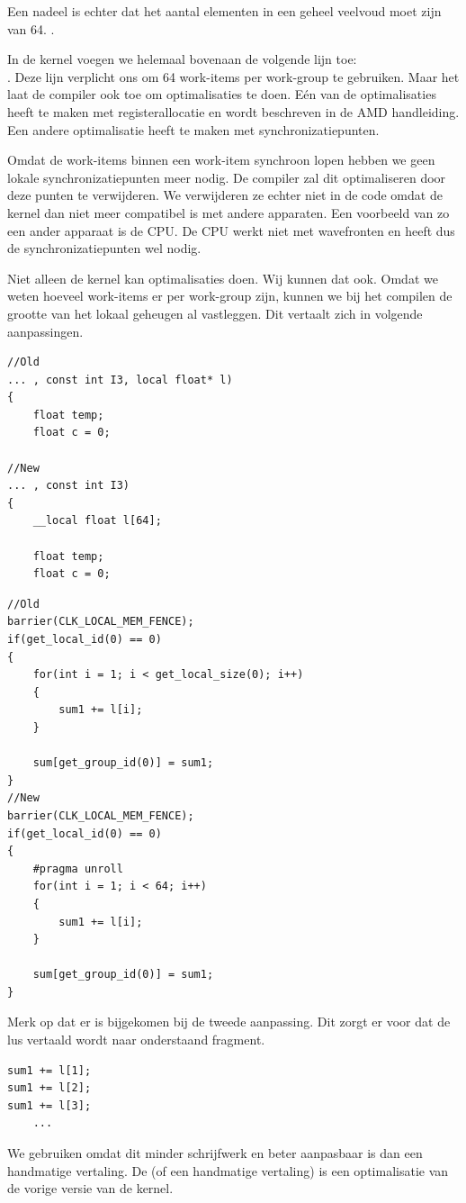 Een nadeel is echter dat het aantal elementen in \TT{} een geheel veelvoud moet zijn van 64. .

In de kernel voegen we helemaal bovenaan de volgende lijn toe:\\ . Deze lijn verplicht ons om 64 work-items per work-group te gebruiken. Maar het laat de compiler ook toe om optimalisaties te doen. E\'en van de optimalisaties heeft te maken met registerallocatie en wordt beschreven in de AMD handleiding\cite[p.~6-27]{ amd}. Een andere optimalisatie heeft te maken met synchronizatiepunten.

Omdat de work-items binnen een work-item synchroon lopen hebben we geen lokale synchronizatiepunten meer nodig. De compiler zal dit optimaliseren door deze punten te verwijderen. We verwijderen ze echter niet in de code omdat de kernel dan niet meer compatibel is met andere apparaten. Een voorbeeld van zo een ander apparaat is de CPU. De CPU werkt niet met wavefronten en heeft dus de synchronizatiepunten wel nodig.

Niet alleen de kernel kan optimalisaties doen. Wij kunnen dat ook. Omdat we weten hoeveel work-items er per work-group zijn, kunnen we bij het compilen de grootte van het lokaal geheugen al vastleggen. Dit vertaalt zich in volgende aanpassingen.

\begin{lstlisting}
//Old
... , const int I3, local float* l)
{
    float temp;
    float c = 0;

//New
... , const int I3)
{
    __local float l[64];
    
    float temp;
    float c = 0;
\end{lstlisting}
\begin{lstlisting}
//Old
barrier(CLK_LOCAL_MEM_FENCE);
if(get_local_id(0) == 0)
{        
    for(int i = 1; i < get_local_size(0); i++)
    {
        sum1 += l[i];
    }
    
    sum[get_group_id(0)] = sum1;
}
//New
barrier(CLK_LOCAL_MEM_FENCE);
if(get_local_id(0) == 0)
{        
    #pragma unroll
    for(int i = 1; i < 64; i++)
    {
        sum1 += l[i];
    }
    
    sum[get_group_id(0)] = sum1;
}
\end{lstlisting}

Merk op dat er  is bijgekomen bij de tweede aanpassing. Dit zorgt er voor dat de lus vertaald wordt naar onderstaand fragment. 
\begin{lstlisting}
sum1 += l[1];
sum1 += l[2];
sum1 += l[3];
    ...
\end{lstlisting}
We gebruiken  omdat dit minder schrijfwerk en beter aanpasbaar is dan een handmatige vertaling. De  (of een handmatige vertaling) is een optimalisatie van de vorige versie van de kernel.

